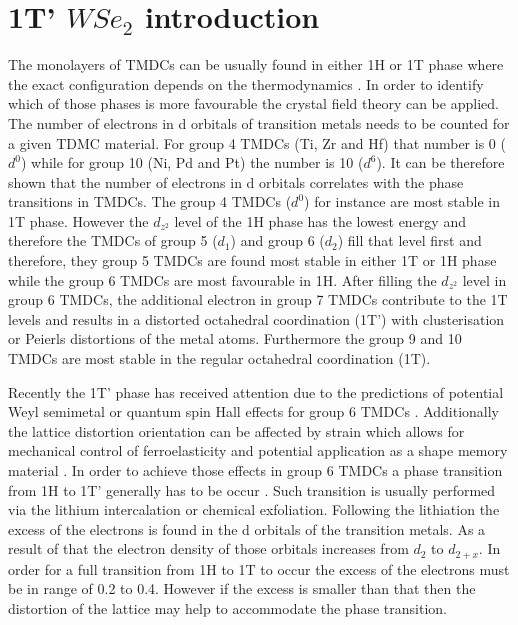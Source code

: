 \chapter{1T' $WSe_2$ introduction}

The monolayers of TMDCs can be usually found in either 1H or 1T phase where the exact configuration depends on the thermodynamics \cite{Keum2015}\cite{Cho2015}. In order to identify which of those phases is more favourable the crystal field theory can be applied. The number of electrons in d orbitals of transition metals needs to be counted for a given TDMC material. For group 4 TMDCs (Ti, Zr and Hf) that number is 0 ($d^0$) while for group 10 (Ni, Pd and Pt) the number is 10 ($d^6$). It can be therefore shown that the number of electrons in d orbitals correlates with the phase transitions in TMDCs. The group 4 TMDCs ($d^0$) for instance are most stable in 1T phase. However the $d_{z^2}$ level of the 1H phase has the lowest energy and therefore the TMDCs of group 5 ($d_1$) and group 6 ($d_2$) fill that level first and therefore, they group 5 TMDCs are found most stable in  either 1T or 1H phase while the group 6 TMDCs are most favourable in 1H. After filling the $d_{z^2}$ level in group 6 TMDCs, the additional electron in group 7 TMDCs contribute to the 1T levels and results in a distorted octahedral coordination (1T') with clusterisation or Peierls distortions of the metal atoms. Furthermore the group 9 and 10 TMDCs are most stable in the regular octahedral coordination (1T).

Recently the 1T' phase has received attention due to the predictions of potential Weyl semimetal or quantum spin Hall effects for group 6 TMDCs \cite{Qian2014}\cite{Sun2015}. Additionally the lattice distortion orientation can be affected by strain which allows for mechanical control of ferroelasticity and potential application as a shape memory material \cite{Li2016}. In order to achieve those effects in group 6 TMDCs a phase transition from 1H to 1T' generally has to be occur \cite{Chhowalla2013}. Such transition is usually performed via the lithium intercalation or chemical exfoliation. Following the lithiation the excess of the electrons is found in the d orbitals of the transition metals. As a result of that the electron density of those orbitals increases from $d_2$ to $d_{2+x}$. In order for a full transition from 1H to 1T to occur the excess of the electrons must be in range of 0.2 to 0.4. However if the excess is smaller than that then the distortion of the lattice may help to accommodate the phase transition.

